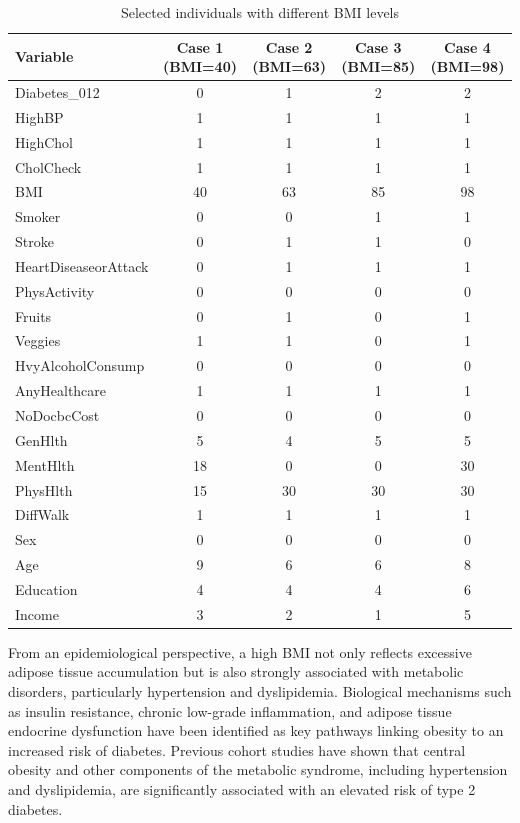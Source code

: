 \begin{table}[H]
\centering
\caption{Selected individuals with different BMI levels}
\label{tab:bmi_cases}

\scriptsize
\setlength{\tabcolsep}{4pt}
\renewcommand{\arraystretch}{1.1}

\begin{tabular}{l|c|c|c|c}
\hline
\textbf{Variable} & \textbf{Case 1 (BMI=40)} & \textbf{Case 2 (BMI=63)} & \textbf{Case 3 (BMI=85)} & \textbf{Case 4 (BMI=98)} \\
\hline
Diabetes\_012 & 0 & 1 & 2 & 2 \\
HighBP & 1 & 1 & 1 & 1 \\
HighChol & 1 & 1 & 1 & 1 \\
CholCheck & 1 & 1 & 1 & 1 \\
BMI & 40 & 63 & 85 & 98 \\
Smoker & 0 & 0 & 1 & 1 \\
Stroke & 0 & 1 & 1 & 0 \\
HeartDiseaseorAttack & 0 & 1 & 1 & 1 \\
PhysActivity & 0 & 0 & 0 & 0 \\
Fruits & 0 & 1 & 0 & 1 \\
Veggies & 1 & 1 & 0 & 1 \\
HvyAlcoholConsump & 0 & 0 & 0 & 0 \\
AnyHealthcare & 1 & 1 & 1 & 1 \\
NoDocbcCost & 0 & 0 & 0 & 0 \\
GenHlth & 5 & 4 & 5 & 5 \\
MentHlth & 18 & 0 & 0 & 30 \\
PhysHlth & 15 & 30 & 30 & 30 \\
DiffWalk & 1 & 1 & 1 & 1 \\
Sex & 0 & 0 & 0 & 0 \\
Age & 9 & 6 & 6 & 8 \\
Education & 4 & 4 & 4 & 6 \\
Income & 3 & 2 & 1 & 5 \\
\hline
\end{tabular}
\end{table}

From an epidemiological perspective, a high BMI not only reflects excessive adipose tissue accumulation but is also strongly associated with metabolic disorders, particularly hypertension and dyslipidemia. Biological mechanisms such as insulin resistance, chronic low-grade inflammation, and adipose tissue endocrine dysfunction have been identified as key pathways linking obesity to an increased risk of diabetes. Previous cohort studies have shown that central obesity and other components of the metabolic syndrome, including hypertension and dyslipidemia, are significantly associated with an elevated risk of type 2 diabetes.

